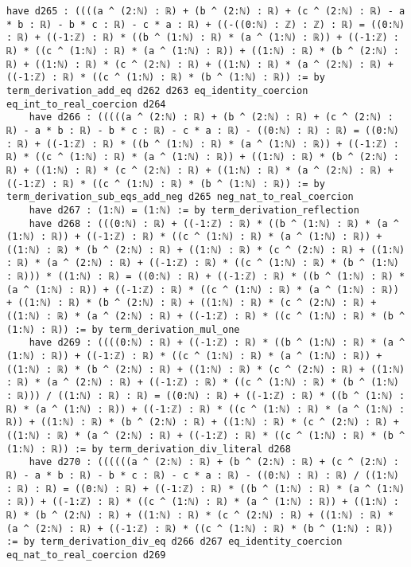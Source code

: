 \documentclass{article}
\begin{document}
\begin{tcolorbox}[colback=white!10, width=\linewidth]
\begin{lstlisting}[language=Lean4]
    have d265 : ((((a ^ (2:ℕ) : ℝ) + (b ^ (2:ℕ) : ℝ) + (c ^ (2:ℕ) : ℝ) - a * b : ℝ) - b * c : ℝ) - c * a : ℝ) + ((-((0:ℕ) : ℤ) : ℤ) : ℝ) = ((0:ℕ) : ℝ) + ((-1:ℤ) : ℝ) * ((b ^ (1:ℕ) : ℝ) * (a ^ (1:ℕ) : ℝ)) + ((-1:ℤ) : ℝ) * ((c ^ (1:ℕ) : ℝ) * (a ^ (1:ℕ) : ℝ)) + ((1:ℕ) : ℝ) * (b ^ (2:ℕ) : ℝ) + ((1:ℕ) : ℝ) * (c ^ (2:ℕ) : ℝ) + ((1:ℕ) : ℝ) * (a ^ (2:ℕ) : ℝ) + ((-1:ℤ) : ℝ) * ((c ^ (1:ℕ) : ℝ) * (b ^ (1:ℕ) : ℝ)) := by term_derivation_add_eq d262 d263 eq_identity_coercion eq_int_to_real_coercion d264
    have d266 : (((((a ^ (2:ℕ) : ℝ) + (b ^ (2:ℕ) : ℝ) + (c ^ (2:ℕ) : ℝ) - a * b : ℝ) - b * c : ℝ) - c * a : ℝ) - ((0:ℕ) : ℝ) : ℝ) = ((0:ℕ) : ℝ) + ((-1:ℤ) : ℝ) * ((b ^ (1:ℕ) : ℝ) * (a ^ (1:ℕ) : ℝ)) + ((-1:ℤ) : ℝ) * ((c ^ (1:ℕ) : ℝ) * (a ^ (1:ℕ) : ℝ)) + ((1:ℕ) : ℝ) * (b ^ (2:ℕ) : ℝ) + ((1:ℕ) : ℝ) * (c ^ (2:ℕ) : ℝ) + ((1:ℕ) : ℝ) * (a ^ (2:ℕ) : ℝ) + ((-1:ℤ) : ℝ) * ((c ^ (1:ℕ) : ℝ) * (b ^ (1:ℕ) : ℝ)) := by term_derivation_sub_eqs_add_neg d265 neg_nat_to_real_coercion
    have d267 : (1:ℕ) = (1:ℕ) := by term_derivation_reflection
    have d268 : (((0:ℕ) : ℝ) + ((-1:ℤ) : ℝ) * ((b ^ (1:ℕ) : ℝ) * (a ^ (1:ℕ) : ℝ)) + ((-1:ℤ) : ℝ) * ((c ^ (1:ℕ) : ℝ) * (a ^ (1:ℕ) : ℝ)) + ((1:ℕ) : ℝ) * (b ^ (2:ℕ) : ℝ) + ((1:ℕ) : ℝ) * (c ^ (2:ℕ) : ℝ) + ((1:ℕ) : ℝ) * (a ^ (2:ℕ) : ℝ) + ((-1:ℤ) : ℝ) * ((c ^ (1:ℕ) : ℝ) * (b ^ (1:ℕ) : ℝ))) * ((1:ℕ) : ℝ) = ((0:ℕ) : ℝ) + ((-1:ℤ) : ℝ) * ((b ^ (1:ℕ) : ℝ) * (a ^ (1:ℕ) : ℝ)) + ((-1:ℤ) : ℝ) * ((c ^ (1:ℕ) : ℝ) * (a ^ (1:ℕ) : ℝ)) + ((1:ℕ) : ℝ) * (b ^ (2:ℕ) : ℝ) + ((1:ℕ) : ℝ) * (c ^ (2:ℕ) : ℝ) + ((1:ℕ) : ℝ) * (a ^ (2:ℕ) : ℝ) + ((-1:ℤ) : ℝ) * ((c ^ (1:ℕ) : ℝ) * (b ^ (1:ℕ) : ℝ)) := by term_derivation_mul_one
    have d269 : ((((0:ℕ) : ℝ) + ((-1:ℤ) : ℝ) * ((b ^ (1:ℕ) : ℝ) * (a ^ (1:ℕ) : ℝ)) + ((-1:ℤ) : ℝ) * ((c ^ (1:ℕ) : ℝ) * (a ^ (1:ℕ) : ℝ)) + ((1:ℕ) : ℝ) * (b ^ (2:ℕ) : ℝ) + ((1:ℕ) : ℝ) * (c ^ (2:ℕ) : ℝ) + ((1:ℕ) : ℝ) * (a ^ (2:ℕ) : ℝ) + ((-1:ℤ) : ℝ) * ((c ^ (1:ℕ) : ℝ) * (b ^ (1:ℕ) : ℝ))) / ((1:ℕ) : ℝ) : ℝ) = ((0:ℕ) : ℝ) + ((-1:ℤ) : ℝ) * ((b ^ (1:ℕ) : ℝ) * (a ^ (1:ℕ) : ℝ)) + ((-1:ℤ) : ℝ) * ((c ^ (1:ℕ) : ℝ) * (a ^ (1:ℕ) : ℝ)) + ((1:ℕ) : ℝ) * (b ^ (2:ℕ) : ℝ) + ((1:ℕ) : ℝ) * (c ^ (2:ℕ) : ℝ) + ((1:ℕ) : ℝ) * (a ^ (2:ℕ) : ℝ) + ((-1:ℤ) : ℝ) * ((c ^ (1:ℕ) : ℝ) * (b ^ (1:ℕ) : ℝ)) := by term_derivation_div_literal d268
    have d270 : ((((((a ^ (2:ℕ) : ℝ) + (b ^ (2:ℕ) : ℝ) + (c ^ (2:ℕ) : ℝ) - a * b : ℝ) - b * c : ℝ) - c * a : ℝ) - ((0:ℕ) : ℝ) : ℝ) / ((1:ℕ) : ℝ) : ℝ) = ((0:ℕ) : ℝ) + ((-1:ℤ) : ℝ) * ((b ^ (1:ℕ) : ℝ) * (a ^ (1:ℕ) : ℝ)) + ((-1:ℤ) : ℝ) * ((c ^ (1:ℕ) : ℝ) * (a ^ (1:ℕ) : ℝ)) + ((1:ℕ) : ℝ) * (b ^ (2:ℕ) : ℝ) + ((1:ℕ) : ℝ) * (c ^ (2:ℕ) : ℝ) + ((1:ℕ) : ℝ) * (a ^ (2:ℕ) : ℝ) + ((-1:ℤ) : ℝ) * ((c ^ (1:ℕ) : ℝ) * (b ^ (1:ℕ) : ℝ)) := by term_derivation_div_eq d266 d267 eq_identity_coercion eq_nat_to_real_coercion d269

\end{lstlisting}
\end{tcolorbox}
\end{document}

